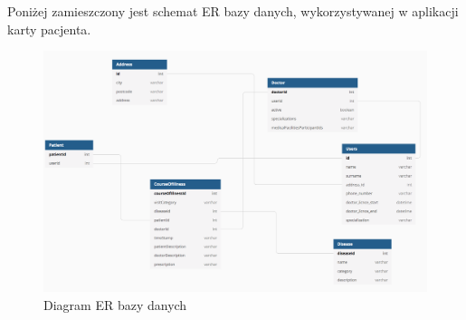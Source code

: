 Poniżej zamieszczony jest schemat ER bazy danych, wykorzystywanej w aplikacji karty pacjenta.
\begin{figure}[H]
\centering
\includegraphics[width=15cm]{pictures/diagram}
\caption{Diagram ER bazy danych}
\end{figure}